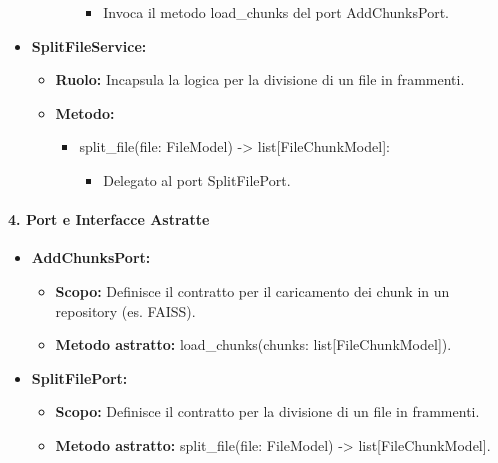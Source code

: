 \begin{itemize}
\begin{itemize}
\begin{itemize}
                \begin{itemize}
                    \item Invoca il metodo load\_chunks del port AddChunksPort.
                \end{itemize}
            \end{itemize}
        \end{itemize}
        \item \textbf{SplitFileService:}
        \begin{itemize}
            \item \textbf{Ruolo:} Incapsula la logica per la divisione di un file in frammenti.
            \item \textbf{Metodo:}
            \begin{itemize}
                \item split\_file(file: FileModel) -> list[FileChunkModel]:
                \begin{itemize}
                    \item Delegato al port SplitFilePort.
                \end{itemize}
            \end{itemize}
        \end{itemize}
    \end{itemize}

    \paragraph{4. Port e Interfacce Astratte}
    \begin{itemize}
        \item \textbf{AddChunksPort:}
        \begin{itemize}
            \item \textbf{Scopo:} Definisce il contratto per il caricamento dei chunk in un repository (es. FAISS).
            \item \textbf{Metodo astratto:} load\_chunks(chunks: list[FileChunkModel]).
        \end{itemize}
        \item \textbf{SplitFilePort:}
        \begin{itemize}
            \item \textbf{Scopo:} Definisce il contratto per la divisione di un file in frammenti.
            \item \textbf{Metodo astratto:} split\_file(file: FileModel) -> list[FileChunkModel].
        \end{itemize}
    \end{itemize}

